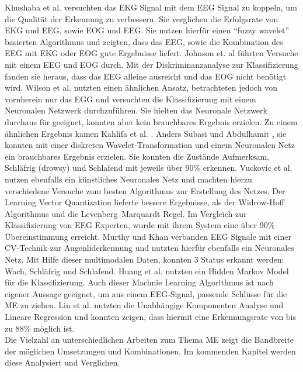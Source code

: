 {Khushaba et al. \cite{Khushaba_5580017} versuchten das EKG Signal mit dem EEG Signal zu koppeln, um die Qualität der Erkennung zu verbessern. Sie verglichen die Erfolgsrate von EKG und EEG, sowie EOG und EEG. Sie nutzen hierfür einen "`fuzzy wavelet"' basierten Algorithmus und zeigten, dass das EEG, sowie die Kombination des EEG mit EKG oder EOG gute Ergebnisse liefert. Johnson et. al \cite{Johnson11} führten Versuche mit einem EEG und EOG durch. Mit der Diskriminanzanalyse zur Klassifizierung fanden sie heraus, dass das EEG alleine ausreicht und das EOG nicht benötigt wird. Wilson et al. \cite{wilson_890161} nutzten einen ähnlichen Ansatz, betrachteten jedoch von vornherein nur das EGG und versuchten die Klassifizierung mit einem Neuronalen Netzwerk durchzuführen. Sie hielten das Neuronale Netzwerk durchaus für geeignet, konnten aber kein brauchbares Ergebnis erzielen. Zu einem ähnlichen Ergebnis kamen Kahlifa et al. \cite{khalifa_893852}. Anders Subasi und Abdulhamit \cite{Subasi:2005:ARA:1707423.1707550}, sie konnten mit einer diskreten Wavelet-Transformation und einem Neuronalen Netz ein brauchbares Ergebnis erzielen. Sie konnten die Zustände Aufmerksam, Schläfrig (drowsy) und Schlafend mit jeweils über 90\% erkennen. Vuckovic et al. \cite{Vuckovic2002349} nutzen ebenfalls ein künstliches Neuronales Netz und machten hierzu verschiedene Versuche zum besten Algorithmus zur Erstellung des Netzes. Der Learning Vector Quantization lieferte bessere Ergebnisse, als der Widrow-Hoff Algorithmus und die Levenberg–Marquardt Regel. Im Vergleich zur Klassifizierung von EEG Experten, wurde mit ihrem System  eine über 90\% Übereinstimmung erreicht. Murthy und Khan \cite{Murthy_1} verbanden EEG Signale mit einer CV-Technik zur Augenliderkennung und nutzten hierfür ebenfalls ein Neuronales Netz. Mit Hilfe dieser multimodalen Daten, konnten 3 Status erkannt werden: Wach, Schläfrig und Schlafend.
Huang et al. \cite{Huang_548971} nutzten ein Hidden Markov Model für die Klassifizierung. Auch dieser Machnie Learning Algorithmus ist nach eigener Aussage geeignet, um aus einem EEG-Signal, passende Schlüsse für die \acl{ME} zu ziehen. Lin et al. \cite{Lin05eeg-baseddrowsiness} nutzten die Unabhängige Komponenten Analyse und Lineare Regression und konnten zeigen, dass hiermit eine Erkennungsrate von bis zu 88\% möglich ist.\\

Die Vielzahl an unterschiedlichen Arbeiten zum Thema \acl{ME} zeigt die Bandbreite der möglichen Umsetzungen und Kombinationen. Im kommenden Kapitel werden diese Analysiert und Verglichen.

}
